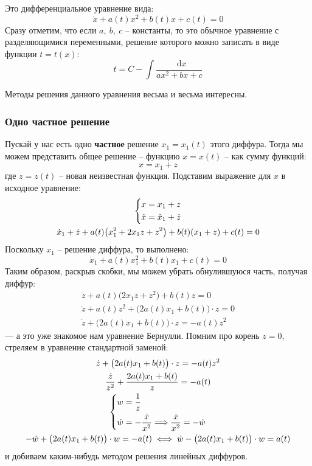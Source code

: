 \documentclass[a4paper,12pt]{article}
\renewcommand*\d{\mathop{}\!\mathrm{d}}
\newcommand{\dw}{\dot{w}}
\newcommand{\dx}{\dot{x}}
\newcommand{\dz}{\dot{z}}
\newcommand{\ds}{\displaystyle}
\begin{document}
Это дифференциальное уравнение вида:
\[\dx + a(t)x^2 + b(t)x + c(t) = 0\]
Сразу отметим, что если $a,\ b,\ c$ -- константы, то это обычное уравнение с разделяющимися переменными, решение которого можно записать в виде функции $t = t(x)$:
\[t = C - \ds\int\dfrac{\d x}{ax^2 + bx + c}\]

Методы решения данного уравнения весьма и весьма интересны.

\subsubsection{Одно частное решение}

Пускай у нас есть одно \textbf{частное} решение $x_1 = x_1(t)$ этого диффура. Тогда мы можем представить общее решение -- функцию $x = x(t)$ -- как сумму функций:
\[x = x_1 + z\] где $z = z(t)$ -- новая неизвестная функция. Подставим выражение для $x$ в исходное уравнение:
\begin{gather*}
	\left\{\begin{gathered}
	x = x_1 + z\hfill\\
	\dx = \dx_1 + \dz\hfill
	\end{gathered}\right.\\
	\dx_1 + \dz + a(t)\big(x_1^2  + 2x_1z + z^2\big) + b(t)(x_1 + z) + c(t) = 0\\
\end{gather*}
Поскольку $x_1$ -- решение диффура, то выполнено:
\[\dx_1 + a(t)x_1^2 + b(t)x_1 + c(t) = 0\]
Таким образом, раскрыв скобки, мы можем убрать обнулившуюся часть, получая диффур:
\begin{gather*}
\dz + a(t)\big(2x_1z + z^2\big) + b(t)z = 0\\
\dz + a(t)z^2 + \big(2a(t)x_1 + b(t)\big) \cdot z = 0\\
\dz + \big(2a(t)x_1 + b(t)\big) \cdot z = -a(t)z^2
\end{gather*}
--- а это уже знакомое нам уравнение Бернулли. Помним про корень $z = 0$, стреляем в уравнение стандартной заменой:
\begin{gather*}
\dz + \big(2a(t)x_1 + b(t)\big) \cdot z = -a(t)z^2\\
\dfrac{\dz}{z^2} + \dfrac{2a(t)x_1 + b(t)}{z} = -a(t)\\
\left\{\begin{gathered}
w = \dfrac{1}{z}\hfill\\
\dw = -\dfrac{\dx}{x^2} \Longrightarrow \dfrac{\dx}{x^2} = -\dw\hfill
\end{gathered}\right.\\
-\dw + \big(2a(t)x_1 + b(t)\big) \cdot w = -a(t) \iff \dw - \big(2a(t)x_1 + b(t)\big) \cdot w = a(t)
\end{gather*}
и добиваем каким-нибудь методом решения линейных диффуров.
\end{document}
